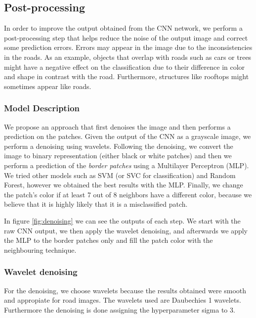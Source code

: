 \documentclass[10pt,conference,compsocconf]{IEEEtran}
\begin{document}
\subsection{Post-processing}
In order to improve the output obtained from the CNN network, we perform a post-processing step that helps reduce the noise of the output image and correct some prediction errors. Errors may appear in the image due to the inconsistencies in the roads. As an example, objects that overlap with roads such as cars or trees might have a negative effect on the classification due to their difference in color and shape in contrast with the road. Furthermore, structures like rooftops might sometimes appear like roads.\\
\subsubsection{Model Description}
We propose an approach that first denoises the image and then performs a prediction on the patches. Given the output of the CNN as a grayscale image, we perform a denoising using wavelets. Following the denoising, we convert the image to binary representation (either black or white patches) and then we perform a prediction of the \textit{border patches} using a Multilayer Perceptron (MLP). We tried other models such as SVM (or SVC for classification) and Random Forest, however we obtained the best results with the MLP. Finally, we change the patch's color if at least 7 out of 8 neighbors have a different color, because we believe that it is highly likely that it is a misclassified patch.

In figure \ref{fig:denoising} we can see the outputs of each step. We start with the raw CNN output, we then apply the wavelet denoising, and afterwards we apply the MLP to the border patches only and fill the patch color with the neighbouring technique.
\subsubsection{Wavelet denoising}
For the denoising, we choose wavelets because the results obtained were smooth and appropiate for road images. The wavelets used are Daubechies 1 wavelets. Furthermore the denoising is done assigning the hyperparameter sigma to 3. 
\end{document}
